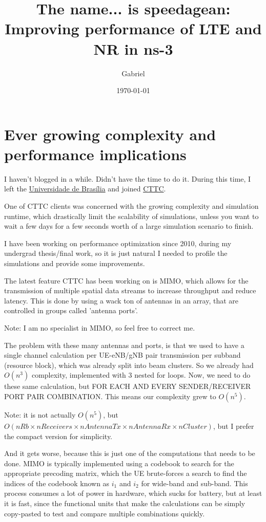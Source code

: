 \documentclass{article}
\title{The name... is speedagean: Improving performance of LTE and NR in ns-3}
\author{Gabriel}
\date{\today}
\begin{document}
\maketitle

\begin{abstract}
\end{abstract}

\section{Ever growing complexity and performance implications}

I haven't blogged in a while. Didn't have the time to do it. During this time,
I left the \href{https://cic.unb.br/}{Universidade de Brasília} and joined
\href{https://www.cttc.cat/}{CTTC}.

One of CTTC clients was concerned with the growing complexity and simulation
runtime, which drastically limit the scalability of simulations, unless you
want to wait a few days for a few seconds worth of a large simulation scenario
to finish.

I have been working on performance optimization since 2010, during my undergrad
thesis/final work, so it is just natural I needed to profile the simulations
and provide some improvements.

The latest feature CTTC has been working on is MIMO, which allows for the
transmission of multiple spatial data streams to increase throughput and
reduce latency. This is done by using a wack ton of antennas in an array, that
are controlled in groups called 'antenna ports'.

Note: I am no specialist in MIMO, so feel free to correct me.

The problem with these many antennas and ports, is that we used to have a single
channel calculation per UE-eNB/gNB pair transmission per subband (resource block),
which was already split into beam clusters. So we already had $O(n^3)$ complexity,
implemented with 3 nested for loops. Now, we need to do these same calculation,
but FOR EACH AND EVERY SENDER/RECEIVER PORT PAIR COMBINATION. This means our
complexity grew to $O(n^5)$.

Note: it is not actually $O(n^5)$, but
$O(nRb\times nReceivers \times nAntennaTx \times nAntennaRx \times nCluster)$,
but I prefer the compact version for simplicity.

And it gets worse, because this is just one of the computations that needs to be done.
MIMO is typically implemented using a codebook to search for the appropriate
precoding matrix, which the UE brute-forces a search to find the indices
of the codebook known as $i_{1}$ and $i_{2}$ for wide-band and sub-band.
This process consumes a lot of power in hardware, which sucks for battery,
but at least it is fast, since the functional units that make the calculations
can be simply copy-pasted to test and compare multiple combinations quickly.
\end{document}
